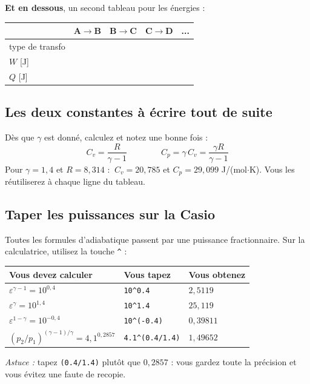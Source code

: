 \documentclass[10.5pt,a4paper]{article}
\newcounter{et}[section]
\begin{document}
\textbf{Et en dessous}, un second tableau pour les énergies :

\begin{center}
\renewcommand{\arraystretch}{1.5}
\begin{tabular}{@{}l|c|c|c|c@{}}
\toprule
& \textbf{A$\to$B} & \textbf{B$\to$C} & \textbf{C$\to$D} & \textbf{...} \\
\midrule
type de transfo & & & & \\
$W$ [J] & & & & \\
$Q$ [J] & & & & \\
\bottomrule
\end{tabular}
\end{center}

\subsection*{Les deux constantes à écrire tout de suite}
Dès que $\gamma$ est donné, calculez et notez une bonne fois :
\[C_v=\frac{R}{\gamma-1}\qquad\qquad C_p=\gamma\,C_v=\frac{\gamma R}{\gamma-1}\]
Pour $\gamma=1{,}4$ et $R=8{,}314$ : $\ \boxed{C_v=20{,}785}$ et $\boxed{C_p=29{,}099}$ J/(mol$\cdot$K).
Vous les réutiliserez à chaque ligne du tableau.

\subsection*{Taper les puissances sur la Casio}
Toutes les formules d'adiabatique passent par une puissance fractionnaire. Sur la calculatrice, utilisez
la touche \verb|^| :
\begin{center}
\small
\begin{tabular}{@{}l l l@{}}
\toprule
\textbf{Vous devez calculer} & \textbf{Vous tapez} & \textbf{Vous obtenez} \\
\midrule
$\varepsilon^{\gamma-1}=10^{0,4}$ & \verb|10^0.4| & $2{,}5119$ \\
$\varepsilon^{\gamma}=10^{1,4}$ & \verb|10^1.4| & $25{,}119$ \\
$\varepsilon^{1-\gamma}=10^{-0,4}$ & \verb|10^(-0.4)| & $0{,}39811$ \\
$(p_2/p_1)^{(\gamma-1)/\gamma}=4{,}1^{0,2857}$ & \verb|4.1^(0.4/1.4)| & $1{,}49652$ \\
\bottomrule
\end{tabular}
\end{center}
\emph{Astuce :} tapez \verb|(0.4/1.4)| plutôt que $0{,}2857$ : vous gardez toute la précision et vous
évitez une faute de recopie.
\end{document}
